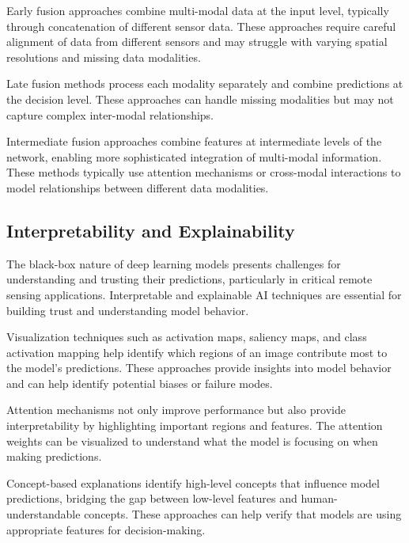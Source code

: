 \documentclass[12pt,a4paper]{article}
\begin{document}
Early fusion approaches combine multi-modal data at the input level, typically through concatenation of different sensor data. These approaches require careful alignment of data from different sensors and may struggle with varying spatial resolutions and missing data modalities.

Late fusion methods process each modality separately and combine predictions at the decision level. These approaches can handle missing modalities but may not capture complex inter-modal relationships.

Intermediate fusion approaches combine features at intermediate levels of the network, enabling more sophisticated integration of multi-modal information. These methods typically use attention mechanisms or cross-modal interactions to model relationships between different data modalities.

\subsection{Interpretability and Explainability}
The black-box nature of deep learning models presents challenges for understanding and trusting their predictions, particularly in critical remote sensing applications. Interpretable and explainable AI techniques are essential for building trust and understanding model behavior.

Visualization techniques such as activation maps, saliency maps, and class activation mapping help identify which regions of an image contribute most to the model's predictions. These approaches provide insights into model behavior and can help identify potential biases or failure modes.

Attention mechanisms not only improve performance but also provide interpretability by highlighting important regions and features. The attention weights can be visualized to understand what the model is focusing on when making predictions.

Concept-based explanations identify high-level concepts that influence model predictions, bridging the gap between low-level features and human-understandable concepts. These approaches can help verify that models are using appropriate features for decision-making.
\end{document}
